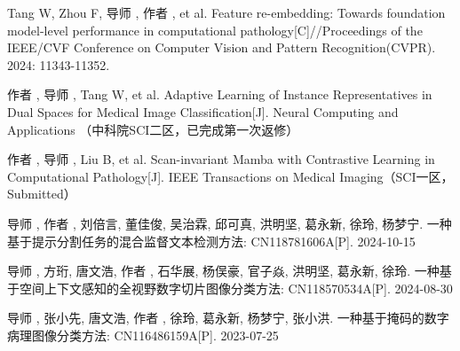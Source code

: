 {
\small
\setlength{\baselineskip}{20pt}
\begin{enumerate}[label={[\arabic*]}, leftmargin=*]
\item Tang W, Zhou F, 导师 , 作者 , et al. Feature re-embedding: Towards foundation model-level performance in computational pathology[C]//Proceedings of the IEEE/CVF Conference on Computer Vision and Pattern Recognition(CVPR). 2024: 11343-11352. 
\item 作者 , 导师 , Tang W,  et al. Adaptive Learning of Instance Representatives in Dual Spaces for Medical Image Classification[J]. Neural Computing and Applications （中科院SCI二区，已完成第一次返修）
\item 作者 , 导师 , Liu B, et al. Scan-invariant Mamba with Contrastive Learning in Computational Pathology[J]. IEEE Transactions on Medical Imaging（SCI一区，Submitted）
\item 导师 , 作者 , 刘倍言, 董佳俊, 吴治霖, 邱可真, 洪明坚, 葛永新, 徐玲, 杨梦宁. 一种基于提示分割任务的混合监督文本检测方法: CN118781606A[P]. 2024-10-15
\item 导师 , 方珩, 唐文浩, 作者 , 石华展, 杨俣豪, 官子焱, 洪明坚, 葛永新, 徐玲. 一种基于空间上下文感知的全视野数字切片图像分类方法: CN118570534A[P]. 2024-08-30
\item 导师 ,  张小先, 唐文浩, 作者 , 徐玲, 葛永新, 杨梦宁, 张小洪. 一种基于掩码的数字病理图像分类方法: CN116486159A[P]. 2023-07-25
\end{enumerate}
}


